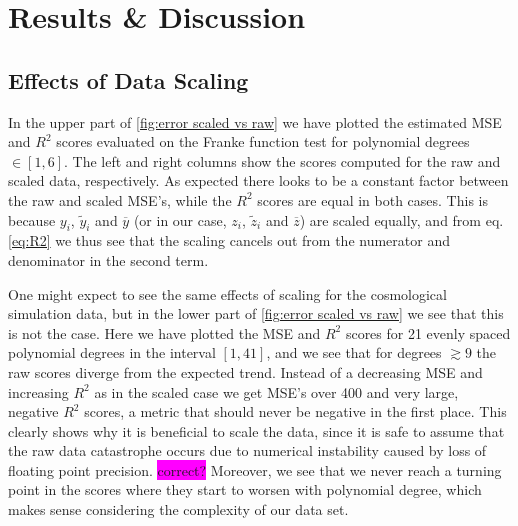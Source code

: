 \documentclass[aps,pra,english,notitlepage,reprint,nofootinbib]{revtex4-1}  %
\begin{document}

\section{Results \& Discussion}\label{sec:results discussion}
\subsection{Effects of Data Scaling}\label{subsec:scaling effect}
In the upper part of \cref{fig:error scaled vs raw} we have plotted the estimated MSE and $R^2$ scores evaluated on the Franke function test for polynomial degrees $\in[1,6]$. The left and right columns show the scores computed for the raw and scaled data, respectively. As expected there looks to be a constant factor between the raw and scaled MSE's, while the $R^2$ scores are equal in both cases. This is because $y_i$, $\tilde{y}_i$ and $\overline{y}$ (or in our case, $z_i$, $\tilde{z}_i$ and $\overline{z}$) are scaled equally, and from eq. \eqref{eq:R2} we thus see that the scaling cancels out from the numerator and denominator in the second term. 

One might expect to see the same effects of scaling for the cosmological simulation data, but in the lower part of \cref{fig:error scaled vs raw} we see that this is not the case. Here we have plotted the MSE and $R^2$ scores for 21 evenly spaced polynomial degrees in the interval $[1,41]$, and we see that for degrees $\gtrsim9$ the raw scores diverge from the expected trend. Instead of a decreasing MSE and increasing $R^2$ as in the scaled case we get MSE's over 400 and very large, negative $R^2$ scores, a metric that should never be negative in the first place. This clearly shows why it is beneficial to scale the data, since it is safe to assume that the raw data catastrophe occurs due to numerical instability caused by loss of floating point precision. \colorbox{magenta}{correct?} Moreover, we see that we never reach a turning point in the scores where they start to worsen with polynomial degree, which makes sense considering the complexity of our data set.
\end{document}
